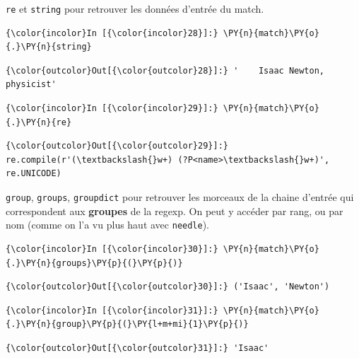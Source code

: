     \texttt{re} et \texttt{string} pour retrouver les données d'entrée du
match.

    \begin{Verbatim}[commandchars=\\\{\}]
{\color{incolor}In [{\color{incolor}28}]:} \PY{n}{match}\PY{o}{.}\PY{n}{string}
\end{Verbatim}


\begin{Verbatim}[commandchars=\\\{\}]
{\color{outcolor}Out[{\color{outcolor}28}]:} '    Isaac Newton, physicist'
\end{Verbatim}
            
    \begin{Verbatim}[commandchars=\\\{\}]
{\color{incolor}In [{\color{incolor}29}]:} \PY{n}{match}\PY{o}{.}\PY{n}{re}
\end{Verbatim}


\begin{Verbatim}[commandchars=\\\{\}]
{\color{outcolor}Out[{\color{outcolor}29}]:} re.compile(r'(\textbackslash{}w+) (?P<name>\textbackslash{}w+)', re.UNICODE)
\end{Verbatim}
            
    \texttt{group}, \texttt{groups}, \texttt{groupdict} pour retrouver les
morceaux de la chaine d'entrée qui correspondent aux \textbf{groupes} de
la regexp. On peut y accéder par rang, ou par nom (comme on l'a vu plus
haut avec \texttt{needle}).

    \begin{Verbatim}[commandchars=\\\{\}]
{\color{incolor}In [{\color{incolor}30}]:} \PY{n}{match}\PY{o}{.}\PY{n}{groups}\PY{p}{(}\PY{p}{)}
\end{Verbatim}


\begin{Verbatim}[commandchars=\\\{\}]
{\color{outcolor}Out[{\color{outcolor}30}]:} ('Isaac', 'Newton')
\end{Verbatim}
            
    \begin{Verbatim}[commandchars=\\\{\}]
{\color{incolor}In [{\color{incolor}31}]:} \PY{n}{match}\PY{o}{.}\PY{n}{group}\PY{p}{(}\PY{l+m+mi}{1}\PY{p}{)}
\end{Verbatim}


\begin{Verbatim}[commandchars=\\\{\}]
{\color{outcolor}Out[{\color{outcolor}31}]:} 'Isaac'
\end{Verbatim}
            
